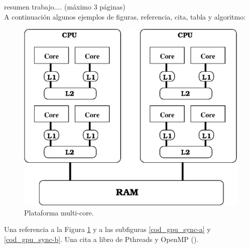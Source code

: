 \documentclass[headings=optiontohead,12pt,letterpaper,oneside,spanish]{book}
\begin{document}
resumen trabajo.... (máximo 3 páginas)\\

A continuación algunos ejemplos de figuras, referencia, cita, tabla y algoritmo:\\

\begin{figure}
\begin{center}
   \includegraphics[scale=0.5]{fig/plataforma.eps}
\end{center}
\caption{\label{fig:plataforma}Plataforma multi-core.}
\end{figure}


Una referencia a la Figura \ref{fig:plataforma} y a las subfiguras \ref{cod_gpu_sync-a} y \ref{cod_gpu_sync-b}.
Una cita a libro de Pthreads \cite{libroPthreads}
y OpenMP (\cite{libroOpenMP}).
\end{document}
